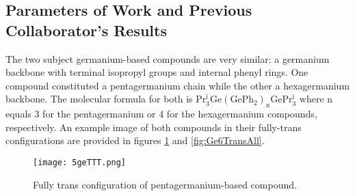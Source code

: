 \subsection{Parameters of Work and Previous Collaborator's Results}

The two subject germanium-based compounds are very similar: a germanium backbone with terminal isopropyl groups and internal phenyl rings. 
One compound constituted a pentagermanium chain while the other a hexagermanium backbone. 
The molecular formula for both is $\mathrm{Pr^{i}_{3}Ge(GePh_{2})_{n}GePr^{i}_{3}}$ where n equals 3 for the pentagermanium or 4 for the hexagermanium compounds, respectively.
An example image of both compounds in their fully-trans configurations are provided in figures \ref{fig:Ge5TransAll} and \ref{fig:Ge6TransAll}.

\begin{figure}
	
	\centering
	
	\texttt{[image: 5geTTT.png]}
	
	\caption{Fully trans configuration of pentagermanium-based compound.}
	
	\label{fig:Ge5TransAll}
	
\end{figure}

